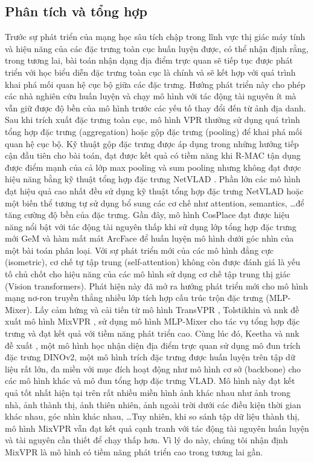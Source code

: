 \subsection{Phân tích và tổng hợp}

Trước sự phát triển của mạng học sâu tích chập trong lĩnh vực thị giác máy tính và hiệu năng của các đặc trưng toàn cục huấn luyện được, có thể nhận định rằng, trong tương lai, bài toán nhận dạng địa điểm trực quan sẽ tiếp tục được phát triển với học biểu diễn đặc trưng toàn cục là chính và sẽ kết hợp với quá trình khai phá mối quan hệ cục bộ giữa các đặc trưng. Hướng phát triển này cho phép các nhà nghiên cứu huấn luyện và chạy mô hình với tác động tài nguyên ít mà vẫn giữ được độ bền của mô hình trước các yếu tố thay đổi đến từ ảnh địa danh. Sau khi trích xuất đặc trưng toàn cục, mô hình VPR thường sử dụng quá trình tổng hợp đặc trưng (aggregation) hoặc gộp đặc trưng (pooling) để khai phá mối quan hệ cục bộ. Kỹ thuật gộp đặc trưng được áp dụng trong những hướng tiếp cận đầu tiên cho bài toán, đạt được kết quả có tiềm năng khi R-MAC \cite{imageSearchKernel} tận dụng được điểm mạnh của cả lớp max pooling và sum pooling nhưng không đạt được hiệu năng bằng kỹ thuật tổng hợp đặc trưng NetVLAD \cite{arandjelovic2016netvlad}. Phần lớn các mô hình đạt hiệu quả cao nhất đều sử dụng kỹ thuật tổng hợp đặc trưng NetVLAD hoặc một biến thể tương tự sử dụng bổ sung các cơ chế như attention, semantics, \dots để tăng cường độ bền của đặc trưng. Gần đây, mô hình CosPlace \cite{berton2022rethinking} đạt được hiệu năng nổi bật với tác động tài nguyên thấp khi sử dụng lớp tổng hợp đặc trưng mới GeM \cite{GeM} và hàm mất mát ArcFace \cite{Deng_2022} để huấn luyện mô hình dưới góc nhìn của một bài toán phân loại. Với sự phát triển mới của các mô hình đẳng cực (isometric), cơ chế tự tập trung (self-attention) không còn được đánh giá là yếu tố chủ chốt cho hiệu năng của các mô hình sử dụng cơ chế tập trung thị giác (Vision transformers). Phát hiện này đã mở ra hướng phát triển mới cho mô hình mạng nơ-ron truyền thẳng nhiều lớp tích hợp cấu trúc trộn đặc trưng (MLP-Mixer). Lấy cảm hứng và cải tiến từ mô hình TransVPR \cite{wang2022transvpr}, Tolstikhin và nnk đề xuất mô hình MixVPR \cite{alibey2023mixvpr}, sử dụng mô hình MLP-Mixer cho tác vụ tổng hợp đặc trưng và đạt kết quả với tiềm năng phát triển cao. Cùng lúc đó, Keetha và nnk đề xuất \cite{keetha2023anyloc}, một mô hình học nhận diện địa điểm trực quan sử dụng mô đun trích đặc trưng DINOv2, một mô hình trích đặc trưng được huấn luyện trên tập dữ liệu rất lớn, đa miền với mục đích hoạt động như mô hình cơ sở (backbone) cho các mô hình khác và mô đun tổng hợp đặc trưng VLAD. Mô hình này đạt kết quả tốt nhất hiện tại trên rất nhiều miền hình ảnh khác nhau như ảnh trong nhà, ảnh thành thị, ảnh thiên nhiên, ảnh ngoài trời dưới các điều kiện thời gian khác nhau, góc nhìn khác nhau, \dots Tuy nhiên, khi so sánh tập dữ liệu thành thị, mô hình MixVPR vẫn đạt kết quả cạnh tranh với tác động tài nguyên huấn luyện và tài nguyên cần thiết để chạy thấp hơn. Vì lý do này, chúng tôi nhận định MixVPR là mô hình có tiềm năng phát triển cao trong tương lai gần.
